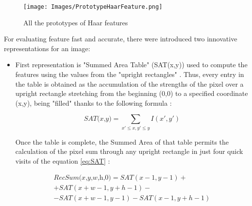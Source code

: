 \begin{figure}[h!]
    \centering
    \texttt{[image: Images/PrototypeHaarFeature.png]}
    \caption{All the prototypes of Haar features \cite{Haar}}
    \label{fig:PrototypeHaarFeature}
\end{figure}

For evaluating feature fast and accurate, there were introduced two innovative representations for an image: 

\begin{itemize}
    \item First representation is "Summed Area Table" (SAT(x,y)) \cite{Viola} used to compute the features using the values from the "upright rectangles" \cite{Haar}. Thus, every entry in the table is obtained as the accumulation of the strengths of the pixel over a upright rectangle stretching from the beginning (0,0) to a specified coordinate (x,y), being "filled" thanks to the following formula \cite{Haar}:
        \begin{center}
            \begin{equation} \label{eq:SAT}
                \textit{SAT(x,y)} = \sum_{x' \leq x,y' \leq y} I(x',y')
            \end{equation}
        \end{center}
    Once the table is complete, the Summed Area of that table permits the calculation of the pixel sum through any upright rectangle in just four quick visits of the equation \ref{eq:SAT} \cite{Haar}: 
        \begin{center}
            \begin{equation}
                \begin{multlined}
                    \textit{RecSum(x,y,w,h,0)} = SAT(x-1,y-1)+ \\ +SAT(x+w-1,y+h-1)- \\ -SAT(x+w-1,y-1)-SAT(x-1,y+h-1)
                \end{multlined}
            \end{equation}
        \end{center}
        

\end{itemize}
